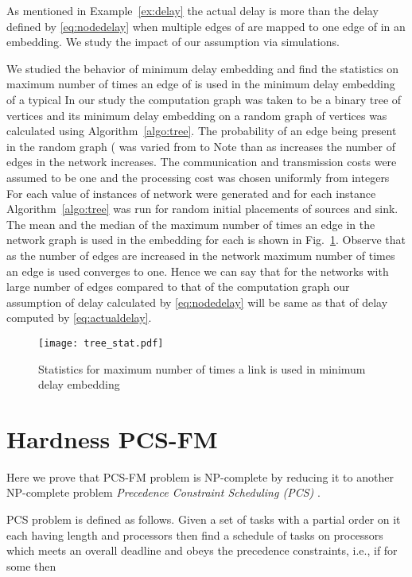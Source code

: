 \documentclass[journal]{IEEEtran}
\begin{document}
As mentioned in Example~\ref{ex:delay} the actual delay is more than
the delay defined by \eqref{eq:nodedelay} when multiple edges of
 are mapped to one edge of  in an embedding. We
study the impact of our assumption via simulations.

We studied the behavior of minimum delay embedding and find the
statistics on maximum number of times an edge of  is used in the
minimum delay embedding of a typical  In our study the
computation graph was taken to be a binary tree of  vertices and
its minimum delay embedding on a random graph of  vertices was
calculated using Algorithm~\ref{algo:tree}. The probability of an edge
being present in the random graph ( was varied from  to
 Note than as  increases the number of edges in the network
increases. The communication and transmission costs were assumed to be
one and the processing cost was chosen uniformly from integers
 For each value of   instances of network were
generated and for each instance Algorithm~\ref{algo:tree} was run for
 random initial placements of sources and sink. The mean and the
median of the maximum number of times an edge in the network graph is
used in the embedding for each  is shown in
Fig.~\ref{fig:meantree}. Observe that as the number of edges are
increased in the network maximum number of times an edge is used
converges to one. Hence we can say that for the networks with large
number of edges compared to that of the computation graph our
assumption of delay calculated by \eqref{eq:nodedelay} will be same as
that of delay computed by \eqref{eq:actualdelay}.

\begin{figure}[tbp]
  \centering
  \texttt{[image: tree\_stat.pdf]}
  \caption{Statistics for maximum number of times a link is used in
    minimum delay embedding}
  \label{fig:meantree}
\end{figure}





\appendices

\section{Hardness PCS-FM}
\label{sec:PCS-FM}

Here we prove that PCS-FM problem is NP-complete by reducing it to
another NP-complete problem \textit{Precedence Constraint Scheduling
  (PCS)} \cite{Garey79}.

PCS problem is defined as follows. Given a set  of tasks
with a  partial order on it each having length
 and 
processors then find a schedule  of tasks on processors which
meets an overall deadline  and obeys the precedence
constraints, i.e., if for some   then 
\end{document}
